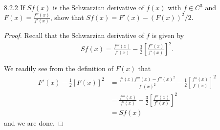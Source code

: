 \begin{problem}{8.2.2}
  If $Sf(x)$ is the Schwarzian derivative of $f(x)$ with $f \in C^3$ and
  $\displaystyle F(x) = \frac{f''(x)}{f'(x)}$, show that
  $Sf(x) = F'(x) - (F(x))^2/2$.
\end{problem}

\begin{proof}
  Recall that the Schwarzian derivative of $f$ is given by
  \begin{align*}
    Sf(x) = \frac{f'''(x)}{f'(x)} - \frac{3}{2}\left[\frac{f''(x)}{f'(x)}\right]^2.
  \end{align*}

  We readily see from the definition of $F(x)$ that
  \begin{align*}
    F'(x) - \frac{1}{2}\left[F(x)\right]^2
    &= \frac{f'(x)f'''(x) - f''(x)^2}{f'(x)^2} - \frac{1}{2}\left[\frac{f''(x)}{f'(x)}\right]^2 \\
    &= \frac{f'''(x)}{f'(x)} - \frac{3}{2}\left[\frac{f''(x)}{f'(x)}\right]^2 \\
    &= Sf(x)
  \end{align*}
  and we are done.
\end{proof}
\newpage
